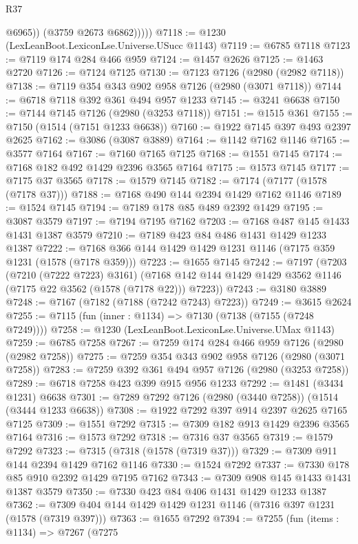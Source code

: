 \begin{lexlean}{R37}
\begin{coremodule}
                @6965))
            (@3759 @2673 @6862)))))
@7118 := @1230 (LexLeanBoot.LexiconLse.Universe.USucc @1143)
@7119 := @6785 @7118
@7123 := @7119 @174 @284 @466 @959
@7124 := @1457 @2626
@7125 := @1463 @2720
@7126 := @7124 @7125
@7130 := @7123 @7126 (@2980 (@2982 @7118))
@7138 := @7119 @354 @343 @902 @958 @7126 (@2980 (@3071 @7118))
@7144 := @6718 @7118 @392 @361 @494 @957 @1233
@7145 := @3241 @6638
@7150 := @7144 @7145 @7126 (@2980 (@3253 @7118))
@7151 := @1515 @361
@7155 := @7150 (@1514 (@7151 @1233 @6638))
@7160 := @1922 @7145 @397 @493 @2397 @2625
@7162 := @3086 (@3087 @3889)
@7164 := @1142 @7162 @1146
@7165 := @3577 @7164
@7167 := @7160 @7165 @7125
@7168 := @1551 @7145
@7174 := @7168 @182 @492 @1429 @2396 @3565 @7164
@7175 := @1573 @7145
@7177 := @7175 @37 @3565
@7178 := @1579 @7145
@7182 := @7174 (@7177 (@1578 (@7178 @37)))
@7188 := @7168 @490 @144 @2394 @1429 @7162 @1146
@7189 := @1524 @7145
@7194 := @7189 @178 @85 @489 @2392 @1429
@7195 := @3087 @3579
@7197 := @7194 @7195 @7162
@7203 := @7168 @487 @145 @1433 @1431 @1387 @3579
@7210 := @7189 @423 @84 @486 @1431 @1429 @1233 @1387
@7222 := @7168 @366 @144 @1429 @1429 @1231 @1146 (@7175 @359 @1231 (@1578 (@7178 @359)))
@7223 := @1655 @7145
@7242 := @7197
    (@7203
      (@7210 (@7222 @7223) @3161)
      (@7168 @142 @144 @1429 @1429 @3562 @1146 (@7175 @22 @3562 (@1578 (@7178 @22))) @7223))
@7243 := @3180 @3889
@7248 := @7167 (@7182 (@7188 (@7242 @7243) @7223))
@7249 := @3615 @2624
@7255 := @7115 (fun (inner : @1134) => @7130 (@7138 (@7155 (@7248 @7249))))
@7258 := @1230 (LexLeanBoot.LexiconLse.Universe.UMax @1143)
@7259 := @6785 @7258
@7267 := @7259 @174 @284 @466 @959 @7126 (@2980 (@2982 @7258))
@7275 := @7259 @354 @343 @902 @958 @7126 (@2980 (@3071 @7258))
@7283 := @7259 @392 @361 @494 @957 @7126 (@2980 (@3253 @7258))
@7289 := @6718 @7258 @423 @399 @915 @956 @1233
@7292 := @1481 (@3434 @1231) @6638
@7301 := @7289 @7292 @7126 (@2980 (@3440 @7258)) (@1514 (@3444 @1233 @6638))
@7308 := @1922 @7292 @397 @914 @2397 @2625 @7165 @7125
@7309 := @1551 @7292
@7315 := @7309 @182 @913 @1429 @2396 @3565 @7164
@7316 := @1573 @7292
@7318 := @7316 @37 @3565
@7319 := @1579 @7292
@7323 := @7315 (@7318 (@1578 (@7319 @37)))
@7329 := @7309 @911 @144 @2394 @1429 @7162 @1146
@7330 := @1524 @7292
@7337 := @7330 @178 @85 @910 @2392 @1429 @7195 @7162
@7343 := @7309 @908 @145 @1433 @1431 @1387 @3579
@7350 := @7330 @423 @84 @406 @1431 @1429 @1233 @1387
@7362 := @7309 @404 @144 @1429 @1429 @1231 @1146 (@7316 @397 @1231 (@1578 (@7319 @397)))
@7363 := @1655 @7292
@7394 := @7255
    (fun (items : @1134) =>
    @7267
      (@7275

\end{coremodule}
\end{lexlean}
